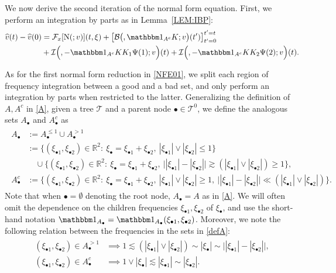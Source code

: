 \documentclass[%
11pt,  reqno]{amsart}
\makeatletter
\newcommand{\5}{\textup{V}}
\newcommand{\noi}{\noindent}
\newcommand{\ft}{\widehat}
\newcommand{\ind}{\mathbbm 1}
\newcommand{\les}{\lesssim}
\theoremstyle{remark}
\newcommand{\R}{\mathbb{R}}
\newcommand{\bul}{\bullet}
\newcommand{\TT}{\mathcal{T}}
\newcommand{\Ft}{{\mathcal{F}}}
\newcommand{\ges}{\gtrsim}
\def\<#1>{\csname MH@symb@#1\endcsname}
\newcommand{\B}{\mathcal{B}}
\newcommand{\Ical}{\mathcal{I}}
\numberwithin{equation}{section}
\numberwithin{theorem}{section}
\newcommand{\NN}{\mathrm{N}}
\makeatother
\begin{document}
We now derive the second iteration of the normal form equation. 
First, we perform an integration by parts as in Lemma~\ref{LEM:IBP}:
\begin{align}
\label{NFE00}
\begin{split}
\ft v(t) 
-
\ft v(0) 
&
=
 \Ft_x[ \NN ( \<1>; v )] (t, \xi) 
+ 
\big[ \B \big( \<1>,  \ind_{A^c} K; v \big)(t') \big]_{t'=0}^{t'=t}
\\
&
+
\Ical \Big( \<21>, - \ind_{A^c} KK_1\Psi(1) ; v  \Big) (t) 
+
\Ical \Big( \<22>, - \ind_{A^c} KK_2\Psi(2) ; v  \Big) (t)
. 
\end{split}
\end{align}

\noi
As for the first normal form reduction in \eqref{NFE01}, we split each region of frequency integration between a good and a bad set, and only perform an integration by parts when restricted to the latter. Generalizing the definition of $A, A^c$ in \eqref{A}, given a tree $\TT$ and a parent node $\bul \in \TT^0$, we define the analogous sets $A_\bul$ and $A_\bul^c$ as
\begin{align}
\label{defA}
\begin{split}
A_\bul& := A_\bul^{\le 1} \cup A_\bul^{> 1}
\\
&
:=
 \big\{ (\xi_{\bul1}, \xi_{\bul2}) \in \R^2: \ \xi_\bul =
\xi_{\bul1}
+ \xi_{\bul2}, \ |\xi_{\bul1}| \lor  |\xi_{\bul2}|  \le 1 \big \} \\
 &
\quad
\cup
\big\{ (\xi_{\bul1}, \xi_{\bul2}) \in \R^2: \ \xi_\bul =
\xi_{\bul1}
+ \xi_{\bul2}, 
\
 \big| | \xi_{\bul1} |  - | \xi_{\bul2}| \big|  \ges (|\xi_{\bul1}| \lor |\xi_{\bul2}|) \ge 1
 \big\} , \\
A_\bul^c & := \big\{ (\xi_{\bul1}, \xi_{\bul2}) \in \R^2: \ \xi_\bul =
\xi_{\bul1} +
\xi_{\bul2},\
|\xi_{\bul1}| \lor |\xi_{\bul2}| \ge1, \
\big| | \xi_{\bul1}| - |\xi_{\bul2}| \big| \ll (|\xi_{\bul1}| \lor |\xi_{\bul2}|)\big\} 
.
\end{split}
\end{align}
Note that when $\bul = \emptyset$ denoting the root node, $A_\bul =A$ as in \eqref{A}. 
We will often omit the dependence on the children frequencies $\xi_{\bul 1}, \xi_{\bul2}$ of $\xi_\bul$, and use the short-hand notation $\ind_{A_\bul}=\ind_{A_\bul} (\xi_{\bul1},\xi_{\bul2})$.
Moreover, we note the following relation between the frequencies in the sets in \eqref{defA}:
\begin{align}
\label{defA2}
\begin{split}
(\xi_{\bul1}, \xi_{\bul2}) \in A_\bul^{> 1} 
&
\implies 1 \les (|\xi_{\bul1}| \lor |\xi_{\bul2}|) \sim |\xi_\bul| \sim \big| | \xi_{\bul1}| - |\xi_{\bul2}| \big|
,
\\
(\xi_{\bul1}, \xi_{\bul2}) \in A_\bul^{c} 
&
\implies 1 \lor  |\xi_{\bul}|  \les |\xi_{\bul1}| \sim |\xi_{\bul2}|
.
\end{split}
\end{align}
\end{document}
